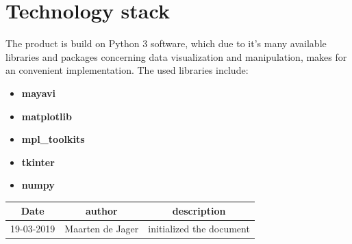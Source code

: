 \documentclass{article}
\begin{document}
\section*{Technology stack}
The product is build on Python 3 software, which due to it's many available libraries and packages concerning data visualization and manipulation, makes for an convenient implementation. The used libraries include:



\begin{itemize}
    \item \textbf{mayavi} 
    \item \textbf{matplotlib}
    \item \textbf{mpl\_toolkits}
    \item \textbf{tkinter}
    \item \textbf{numpy} 
\end{itemize}
\begin{tabular}{c|c|c}
    
     Date& author&description \\
     \hline
     19-03-2019&Maarten de Jager & initialized the document\\
     \hline
\end{tabular}
\end{document}
